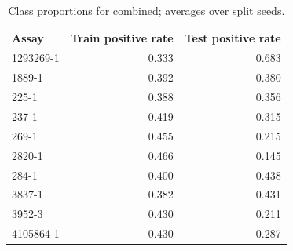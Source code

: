 \begin{table}[htbp]\centering\small
\begin{tabular}{lrr}
\toprule
Assay & Train positive rate & Test positive rate \\
\midrule
1293269-1 & 0.333 & 0.683 \\
1889-1 & 0.392 & 0.380 \\
225-1 & 0.388 & 0.356 \\
237-1 & 0.419 & 0.315 \\
269-1 & 0.455 & 0.215 \\
2820-1 & 0.466 & 0.145 \\
284-1 & 0.400 & 0.438 \\
3837-1 & 0.382 & 0.431 \\
3952-3 & 0.430 & 0.211 \\
4105864-1 & 0.430 & 0.287 \\
\bottomrule
\end{tabular}

\caption{Class proportions for combined; averages over split seeds.}\end{table}
